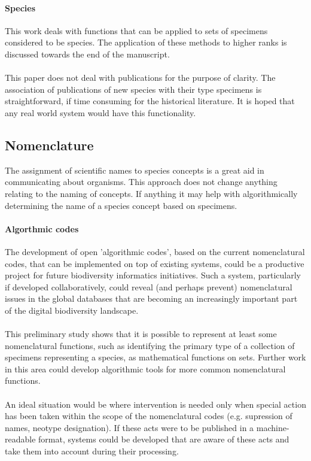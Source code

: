 \documentclass{article}
\begin{document}
   \paragraph{Species}
   This work deals with functions that can be applied to sets of specimens considered to be species. The application of these methods to higher ranks is discussed towards the end of the manuscript.
   \paragraph{}
   This paper does not deal with publications for the purpose of clarity. The association of publications of new species with their type specimens is straightforward, if time consuming for the historical literature. It is hoped that any real world system would have this functionality.
   \subsection{Nomenclature}
   The assignment of scientific names to species concepts is a great aid in communicating about organisms. This approach does not change anything relating to the naming of concepts. If anything it may help with algorithmically determining the name of a species concept based on specimens.
   \paragraph{Algorthmic codes}
   The development of open 'algorithmic codes', based on the current nomenclatural codes, that can be implemented on top of existing systems, could be a productive project for future biodiversity informatics initiatives. Such a system, particularly if developed collaboratively, could reveal (and perhaps prevent) nomenclatural issues in the global databases that are becoming an increasingly important part of the digital biodiversity landscape.
   \paragraph{}
   This preliminary study shows that it is possible to represent at least some nomenclatural functions, such as identifying the primary type of a collection of specimens representing a species, as mathematical functions on sets. Further work in this area could develop algorithmic tools for more common nomenclatural functions.
   \paragraph{}
   An ideal situation would be where intervention is needed only when special action has been taken within the scope of the nomenclatural codes (e.g. supression of names, neotype designation). If these acts were to be published in a machine-readable format, systems could be developed that are aware of these acts and take them into account during their processing. 
\end{document}
